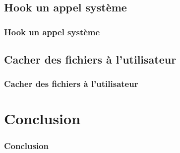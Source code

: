 \documentclass{beamer}
\begin{document}
\subsection{Hook un appel système}

\begin{frame}
\frametitle{Hook un appel système}
\end{frame}

\subsection{Cacher des fichiers à l'utilisateur}

\begin{frame}
\frametitle{Cacher des fichiers à l'utilisateur}
\end{frame}

\section{Conclusion}

\begin{frame}
\frametitle{Conclusion}
\end{frame}
\end{document}
